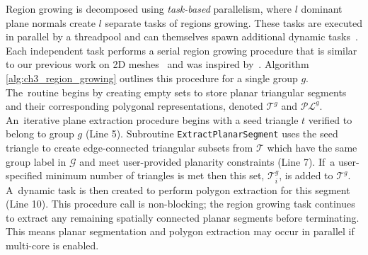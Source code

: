 Region growing is decomposed using \emph{task-based} parallelism, where $l$ dominant plane normals create $l$ separate tasks of regions growing. These tasks are executed in parallel by a threadpool and can themselves spawn additional dynamic tasks~\cite{huang_cpp-taskflow_2019}. Each independent task performs a serial region growing procedure that is similar to our previous work on 2D meshes~\cite{castagno_polylidar_2020} and was inspired by~\cite{cao_roof_2017}. Algorithm \ref{alg:ch3_region_growing} outlines this procedure for a single group $g$. The~routine begins by creating empty sets to store planar triangular segments and their corresponding polygonal representations, denoted $\mathcal{T}^g$ and $\mathcal{PL}^g$.  An~iterative plane extraction procedure begins with a seed triangle $t$  verified to belong to group $g$ (Line 5). Subroutine \texttt{ExtractPlanarSegment} uses the seed triangle to create edge-connected triangular subsets from $\mathcal{T}$ which have the same group label in $\mathcal{G}$ and meet user-provided planarity constraints (Line 7). If~a user-specified minimum number of triangles is met then this set, $\mathcal{T}^g_i$, is added to $\mathcal{T}^g$. A~dynamic task is then created to perform polygon extraction for this segment (Line 10). This procedure call is non-blocking; the region growing task continues to extract any remaining spatially connected planar segments before terminating. This means planar segmentation and polygon extraction may occur in parallel if multi-core is enabled.


